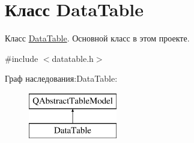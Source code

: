 \hypertarget{class_data_table}{}\section{Класс Data\+Table}
\label{class_data_table}


Класс \mbox{\hyperlink{class_data_table}{Data\+Table}}. Основной класс в этом проекте.  




{\ttfamily \#include $<$datatable.\+h$>$}

Граф наследования\+:Data\+Table\+:\begin{figure}[H]
\begin{center}
\leavevmode
\includegraphics[height=2.000000cm]{class_data_table}
\end{center}
\end{figure}
